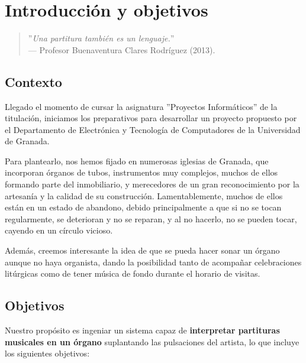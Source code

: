 \chapter{Introducción y objetivos}
\label{cap:capitulo_1}

\begin{quote}
	\small \flushright ''\textit{Una partitura también es un lenguaje.}'' \\
	--- Profesor Buenaventura Clares Rodríguez (2013).
\end{quote}

\vspace{4em}

\section{Contexto}

Llegado el momento de cursar la asignatura ''Proyectos Informáticos'' de la titulación, iniciamos los preparativos para desarrollar un proyecto propuesto por el Departamento de Electrónica y Tecnología de Computadores de la Universidad de Granada.

Para plantearlo, nos hemos fijado en numerosas iglesias de Granada, que incorporan órganos de tubos, instrumentos muy complejos, muchos de ellos formando parte del inmobiliario, y merecedores de un gran reconocimiento por la artesanía y la calidad de su construcción. Lamentablemente, muchos de ellos están en un estado de abandono, debido principalmente a que si no se tocan regularmente, se deterioran y no se reparan, y al no hacerlo, no se pueden tocar, cayendo en un círculo vicioso.

Además, creemos interesante la idea de que se pueda hacer sonar un órgano aunque no haya organista, dando la posibilidad tanto de acompañar celebraciones litúrgicas como de tener música de fondo durante el horario de visitas.

\section{Objetivos}

Nuestro propósito es ingeniar un sistema capaz de \textbf{interpretar partituras musicales en un órgano} suplantando las pulsaciones del artista, lo que incluye los siguientes objetivos:

